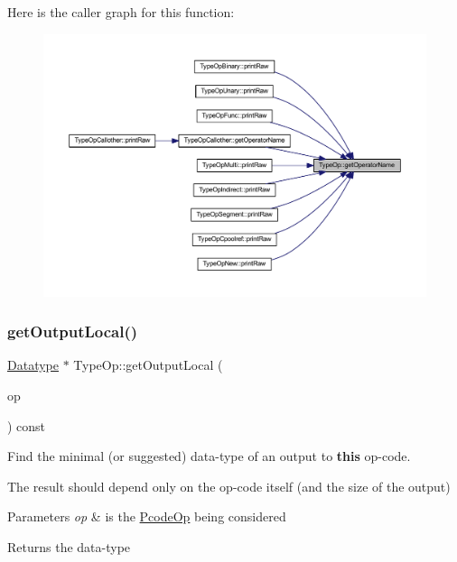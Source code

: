 Here is the caller graph for this function\+:
\nopagebreak
\begin{figure}[H]
\begin{center}
\leavevmode
\includegraphics[width=350pt]{class_type_op_a42a1ffa77f998df24efdb44405b33ac5_icgraph}
\end{center}
\end{figure}
\mbox{\label{class_type_op_a3454cadfb15f6794829123a7ecfe38f5}} 
\subsubsection{\texorpdfstring{getOutputLocal()}{getOutputLocal()}}
{\footnotesize\ttfamily \mbox{\hyperlink{class_datatype}{Datatype}} $\ast$ Type\+Op\+::get\+Output\+Local (\begin{DoxyParamCaption}\item[{const \mbox{\hyperlink{class_pcode_op}{Pcode\+Op}} $\ast$}]{op }\end{DoxyParamCaption}) const\hspace{0.3cm}{\ttfamily [virtual]}}



Find the minimal (or suggested) data-\/type of an output to {\bfseries{this}} op-\/code. 

The result should depend only on the op-\/code itself (and the size of the output) 
\begin{DoxyParams}{Parameters}
{\em op} & is the \mbox{\hyperlink{class_pcode_op}{Pcode\+Op}} being considered \\
\hline
\end{DoxyParams}
\begin{DoxyReturn}{Returns}
the data-\/type 
\end{DoxyReturn}


